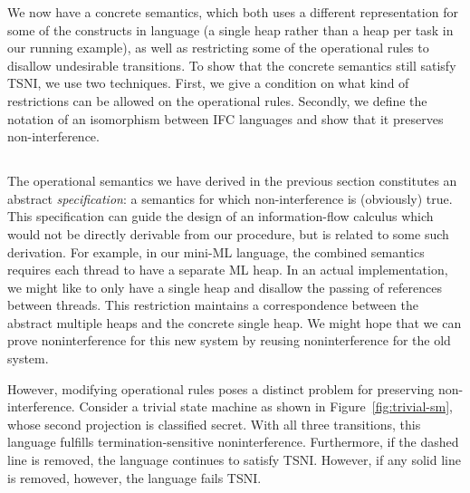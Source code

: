 We now have a concrete semantics, which both uses a different
representation for some of the constructs in language (a single
heap rather than a heap per task in our running example), as well
as restricting some of the operational rules to disallow
undesirable transitions.  To show that the concrete semantics
still satisfy TSNI, we use two techniques.  First, we give a
condition on what kind of restrictions can be allowed on the
operational rules.  Secondly, we define the notation of an
isomorphism between IFC languages and show that it preserves
non-interference.


\subsection{}

The operational semantics we have derived in the previous section
constitutes an abstract \emph{specification}: a semantics for which
non-interference is (obviously) true.  This specification can guide the
design of an information-flow calculus which would not be directly
derivable from our procedure, but is related to some such derivation.
For example, in our mini-ML language, the combined semantics requires
each thread to have a separate ML heap.  In an actual implementation, we
might like to only have a single heap and disallow the passing of
references between threads.  This restriction maintains a correspondence
between the abstract multiple heaps and the concrete single heap.  We might
hope that we can prove noninterference for this new system by reusing
noninterference for the old system.

However, modifying operational rules poses a distinct problem for
preserving non-interference.  Consider a trivial state machine as shown
in Figure~\ref{fig:trivial-sm}, whose second projection is classified
secret.  With all three transitions, this language fulfills
termination-sensitive noninterference.  Furthermore, if the dashed line
is removed, the language continues to satisfy TSNI.  However, if any
solid line is removed, however, the language fails TSNI.

